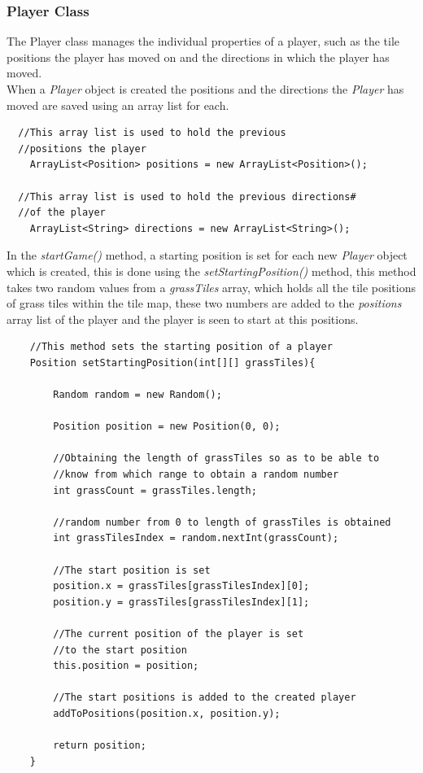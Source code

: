 \documentclass[a4paper,12pt]{extarticle}
\begin{document}
\vspace{4mm}

\newpage
\subsubsection{Player Class}
\noindent The Player class manages the individual properties of a player, such as the tile positions the player has moved on and the directions in which the player has moved.\\

\noindent When a \textit{Player} object is created the positions and the directions the \textit{Player} has moved are saved using an array list for each.

\begin{lstlisting}
  //This array list is used to hold the previous 
  //positions the player
    ArrayList<Position> positions = new ArrayList<Position>();

  //This array list is used to hold the previous directions#
  //of the player
    ArrayList<String> directions = new ArrayList<String>();
\end{lstlisting}
\vspace{4mm}

\noindent In the \textit{startGame()} method, a starting position is set for each new \textit{Player} object which is created, this is done using the \textit{setStartingPosition()} method, this method takes two random values from a \textit{grassTiles} array, which holds all the tile positions of grass tiles within the tile map, these two numbers are added to the \textit{positions} array list of the player and the player is seen to start at this positions.

\begin{lstlisting}
    //This method sets the starting position of a player
    Position setStartingPosition(int[][] grassTiles){

        Random random = new Random();

        Position position = new Position(0, 0);

        //Obtaining the length of grassTiles so as to be able to 
        //know from which range to obtain a random number
        int grassCount = grassTiles.length;

        //random number from 0 to length of grassTiles is obtained
        int grassTilesIndex = random.nextInt(grassCount);

        //The start position is set
        position.x = grassTiles[grassTilesIndex][0];
        position.y = grassTiles[grassTilesIndex][1];

        //The current position of the player is set 
        //to the start position
        this.position = position;

        //The start positions is added to the created player
        addToPositions(position.x, position.y);

        return position;
    }
\end{lstlisting}
\vspace{4mm}
\end{document}
